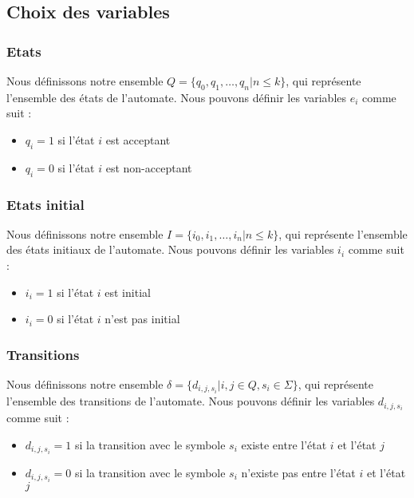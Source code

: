 \documentclass[a4paper, 12pt]{extarticle}
\begin{document}
\subsection{Choix des variables} %
\label{sub:choix_des_variables}

\subsubsection{Etats} %
\label{sec:etats}

Nous définissons notre ensemble $Q = \{q_0, q_1, \dots, q_n | n \le k\}$, qui 
représente l'ensemble des états de l'automate. 
Nous pouvons définir les variables $e_i$ comme suit : 
\begin{itemize}[label=$\bullet$]
    \item $q_i = 1$ si l'état $i$ est acceptant 
    \item $q_i = 0$ si l'état $i$ est non-acceptant 
\end{itemize}

\subsubsection{Etats initial} %
\label{sec:etats_initial}

Nous définissons notre ensemble $I = \{i_0, i_1, \dots, i_n | n \le k\}$, qui 
représente l'ensemble des états initiaux de l'automate. 
Nous pouvons définir les variables $i_i$ comme suit : 
\begin{itemize}[label=$\bullet$]
    \item $i_i = 1$ si l'état $i$ est initial 
    \item $i_i = 0$ si l'état $i$ n'est pas initial 
\end{itemize}



\subsubsection{Transitions} %
\label{sec:transitions} 


Nous définissons notre ensemble $\delta = \{d_{i, j, s_i} | i, j \in Q, s_i \in \Sigma\}$, qui 
représente l'ensemble des transitions de l'automate. 
Nous pouvons définir les variables $d_{i, j, s_i}$ comme suit : 
\begin{itemize}[label=$\bullet$]
    \item $d_{i, j, s_i} = 1$ si la transition avec le symbole $s_i$ existe entre l'état $i$ et l'état $j$ 
    \item $d_{i, j, s_i} = 0$ si la transition avec le symbole $s_i$ n'existe pas entre l'état $i$ et l'état $j$ 
\end{itemize} 
\end{document}
